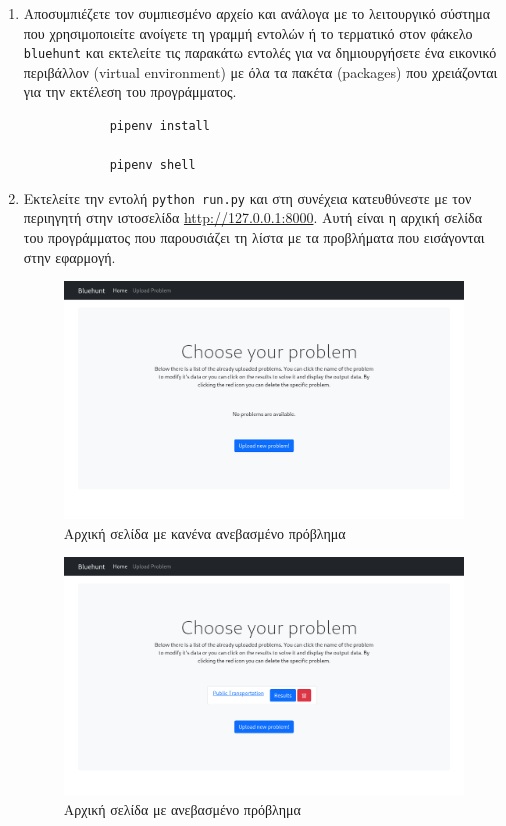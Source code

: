 \documentclass[11pt,a4paper,titlepage]{article}
\numberwithin{equation}{section}
\begin{document}
\begin{enumerate}
	\item Αποσυμπιέζετε τον συμπιεσμένο αρχείο και ανάλογα με το λειτουργικό σύστημα που χρησιμοποιείτε ανοίγετε τη γραμμή εντολών ή το τερματικό στον φάκελο \texttt{bluehunt} και εκτελείτε τις παρακάτω εντολές για να δημιουργήσετε ένα εικονικό περιβάλλον (virtual environment) με όλα τα πακέτα (packages) που χρειάζονται για την εκτέλεση του προγράμματος.
	
	\begin{verbatim}
			pipenv install
			
			pipenv shell
	\end{verbatim}
	
	\item Εκτελείτε την εντολή \texttt{python run.py} και στη συνέχεια κατευθύνεστε με τον περιηγητή στην ιστοσελίδα \url{http://127.0.0.1:8000}. Αυτή είναι η αρχική σελίδα του προγράμματος που παρουσιάζει τη λίστα με τα προβλήματα που εισάγονται στην εφαρμογή.
	
	\begin{figure}[H]
		\centering
		\includegraphics[width=0.8\linewidth]{media/index_no_prob.png}
		\caption{Αρχική σελίδα με κανένα ανεβασμένο πρόβλημα}
		\label{fig:index_no_prob}
	\end{figure}
	
	\begin{figure}[H]
		\centering
		\includegraphics[width=0.8\linewidth]{media/index_with_prob.png}
		\caption{Αρχική σελίδα με ανεβασμένο πρόβλημα}
		\label{fig:index_with_prob}
	\end{figure}
	

\end{enumerate}
\end{document}
